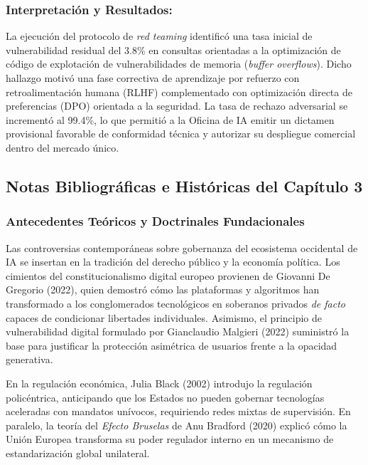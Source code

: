\subsubsection*{Interpretación y Resultados:}
La ejecución del protocolo de \textit{red teaming} identificó una tasa inicial de vulnerabilidad residual del 3.8\% en consultas orientadas a la optimización de código de explotación de vulnerabilidades de memoria (\textit{buffer overflows}). Dicho hallazgo motivó una fase correctiva de aprendizaje por refuerzo con retroalimentación humana (RLHF) complementado con optimización directa de preferencias (DPO) orientada a la seguridad. La tasa de rechazo adversarial se incrementó al 99.4\%, lo que permitió a la Oficina de IA emitir un dictamen provisional favorable de conformidad técnica y autorizar su despliegue comercial dentro del mercado único.

\newpage
{}

\subsection*{Notas Bibliográficas e Históricas del Capítulo 3}

\subsubsection*{Antecedentes Teóricos y Doctrinales Fundacionales}
Las controversias contemporáneas sobre gobernanza del ecosistema occidental de IA se insertan en la tradición del derecho público y la economía política. Los cimientos del constitucionalismo digital europeo provienen de Giovanni De Gregorio (2022), quien demostró cómo las plataformas y algoritmos han transformado a los conglomerados tecnológicos en soberanos privados \textit{de facto} capaces de condicionar libertades individuales. Asimismo, el principio de vulnerabilidad digital formulado por Gianclaudio Malgieri (2022) suministró la base para justificar la protección asimétrica de usuarios frente a la opacidad generativa.

En la regulación económica, Julia Black (2002) introdujo la regulación policéntrica, anticipando que los Estados no pueden gobernar tecnologías aceleradas con mandatos unívocos, requiriendo redes mixtas de supervisión. En paralelo, la teoría del \textit{Efecto Bruselas} de Anu Bradford (2020) explicó cómo la Unión Europea transforma su poder regulador interno en un mecanismo de estandarización global unilateral.

